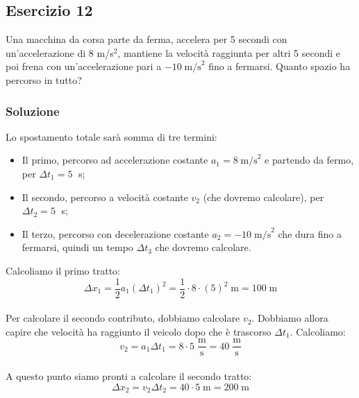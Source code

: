 \documentclass[12pt,a4paper]{book}
\begin{document}
\subsection*{Esercizio 12}
Una macchina da corsa parte da ferma, accelera per 5 secondi con un'accelerazione di 8 m/s$^2$, mantiene la velocità raggiunta per altri 5 secondi e poi frena con un'accelerazione pari a $-10 \; \text{m/s}^2$ fino a fermarsi. Quanto spazio ha percorso in tutto?

\subsubsection*{Soluzione}
Lo spostamento totale sarà somma di tre termini:
\begin{itemize}
\item{Il primo, percorso ad accelerazione costante $a_1 = 8 \; \text{m/s}^2 $ e partendo da fermo, per $\Delta t_1 = 5\;$ s;}
\item{Il secondo, percorso a velocità costante $v_2$ (che dovremo calcolare), per $\Delta t_2 = 5\;$ s;}
\item{Il terzo, percorso con decelerazione costante $a_2 = -10 \;\text{m/s}^2$ che dura fino a fermarsi, quindi un tempo $\Delta t_3$ che dovremo calcolare.}
\end{itemize}
Calcoliamo il primo tratto:\\
\begin{equation*}
\Delta x_1 = \frac{1}{2} a_1 (\Delta t_1)^2 = \frac{1}{2}\cdot 8 \cdot (5)^2 \; \text{m} = 100 \; \text{m}
\end{equation*}\\
Per calcolare il secondo contributo, dobbiamo calcolare $v_2$. Dobbiamo allora capire che velocità ha raggiunto il veicolo dopo che è trascorso $\Delta t_1$. Calcoliamo:\\
\begin{equation*}
v_2 = a_1 \Delta t_1 = 8 \cdot 5 \; \frac{\text{m}}{\text{s}} = 40 \;\frac{\text{m}}{\text{s}}
\end{equation*}\\
A questo punto siamo pronti a calcolare il secondo tratto:\\
\begin{equation*}
\Delta x_2 = v_2 \Delta t_2 = 40 \cdot 5 \; \text{m} = 200 \; \text{m}
\end{equation*}\\
\end{document}
